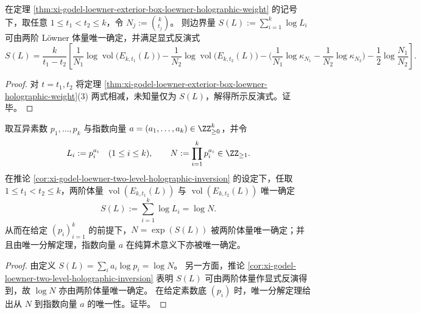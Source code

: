 \begin{corollary}\label{cor:xi-godel-loewner-two-level-holographic-inversion}
在定理 \ref{thm:xi-godel-loewner-exterior-box-loewner-holographic-weight} 的记号下，取任意 \(1\le t_1<t_2\le k\)，令 \(N_j:=\binom{k}{t_j}\)。
则边界量
\(
S(L):=\sum_{i=1}^{k}\log L_i
\)
可由两阶 Löwner 体量唯一确定，并满足显式反演式
\[
S(L)=\frac{k}{t_1-t_2}\left[
\frac{1}{N_1}\log\operatorname{vol}\bigl(E_{k,t_1}(L)\bigr)-\frac{1}{N_2}\log\operatorname{vol}\bigl(E_{k,t_2}(L)\bigr)
-\Big(\frac{1}{N_1}\log\kappa_{N_1}-\frac{1}{N_2}\log\kappa_{N_2}\Big)
-\frac12\log\frac{N_1}{N_2}
\right].
\]
\end{corollary}
\begin{proof}
对 \(t=t_1,t_2\) 将定理 \ref{thm:xi-godel-loewner-exterior-box-loewner-holographic-weight}(3) 两式相减，未知量仅为 \(S(L)\)，解得所示反演式。证毕。
\end{proof}

\begin{corollary}\label{cor:xi-godel-integer-decoding-from-two-loewner-volumes}
取互异素数 \(p_1,\dots,p_k\) 与指数向量 \(a=(a_1,\dots,a_k)\in\ZZ_{\ge 0}^k\)，并令
\[
L_i:=p_i^{a_i}\quad(1\le i\le k),
\qquad
N:=\prod_{i=1}^{k}p_i^{a_i}\in\ZZ_{\ge 1}.
\]
在推论 \ref{cor:xi-godel-loewner-two-level-holographic-inversion} 的设定下，任取 \(1\le t_1<t_2\le k\)，两阶体量
\(
\operatorname{vol}(E_{k,t_1}(L))
\)
与
\(
\operatorname{vol}(E_{k,t_2}(L))
\)
唯一确定
\[
S(L):=\sum_{i=1}^{k}\log L_i=\log N.
\]
从而在给定 \((p_i)_{i=1}^k\) 的前提下，\(N=\exp(S(L))\) 被两阶体量唯一确定；并且由唯一分解定理，指数向量 \(a\) 在纯算术意义下亦被唯一确定。
\end{corollary}
\begin{proof}
由定义 \(S(L)=\sum_i a_i\log p_i=\log N\)。
另一方面，推论 \ref{cor:xi-godel-loewner-two-level-holographic-inversion} 表明 \(S(L)\) 可由两阶体量作显式反演得到，故 \(\log N\) 亦由两阶体量唯一确定。
在给定素数底 \((p_i)\) 时，唯一分解定理给出从 \(N\) 到指数向量 \(a\) 的唯一性。证毕。
\end{proof}


